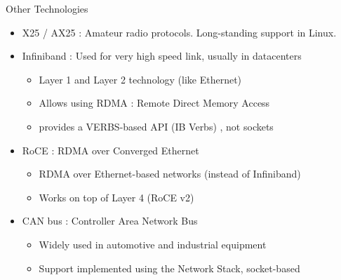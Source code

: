 \begin{frame}{Other Technologies}
	\begin{itemize}
		\item X25 / AX25 : Amateur radio protocols. Long-standing support in Linux.
		\item Infiniband : Used for very high speed link, usually in datacenters
			\begin{itemize}
				\item Layer 1 and Layer 2 technology (like Ethernet)
				\item Allows using RDMA : Remote Direct Memory Access
				\item provides a VERBS-based API (IB Verbs) , not sockets
			\end{itemize}
		\item RoCE : RDMA over Converged Ethernet
			\begin{itemize}
				\item RDMA over Ethernet-based networks (instead of Infiniband)
				\item Works on top of Layer 4 (RoCE v2) 
			\end{itemize}
		\item CAN bus : Controller Area Network Bus
			\begin{itemize}
				\item Widely used in automotive and industrial equipment
				\item Support implemented using the Network Stack, socket-based
			\end{itemize}
	\end{itemize}
\end{frame}

